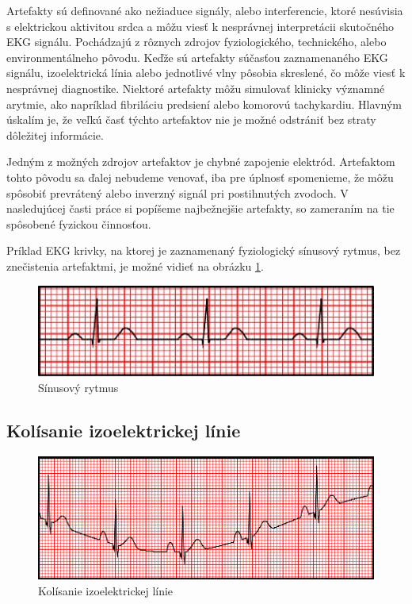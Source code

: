 Artefakty sú definované ako nežiaduce signály, alebo interferencie, ktoré nesúvisia s elektrickou aktivitou srdca a môžu viesť k nesprávnej interpretácii skutočného EKG signálu. Pochádzajú z rôznych zdrojov fyziologického, technického, alebo environmentálneho pôvodu. Keďže sú artefakty súčasťou zaznamenaného EKG signálu, izoelektrická línia alebo jednotlivé vlny pôsobia skreslené, čo môže viesť k nesprávnej diagnostike. Niektoré artefakty môžu simulovať klinicky významné arytmie, ako napríklad fibriláciu predsiení alebo komorovú tachykardiu. Hlavným úskalím je, že veľkú časť týchto artefaktov nie je možné odstrániť bez straty dôležitej informácie. 

Jedným z možných zdrojov artefaktov je chybné zapojenie elektród. Artefaktom tohto pôvodu sa ďalej nebudeme venovať, iba pre úplnosť spomenieme, že môžu spôsobiť prevrátený alebo inverzný signál pri postihnutých zvodoch.\cite{PrezRiera2017}\cite{Littmann2021} V nasledujúcej časti práce si popíšeme najbežnejšie artefakty, so zameraním na tie spôsobené fyzickou činnosťou. 

Príklad EKG krivky, na ktorej je zaznamenaný fyziologický sínusový rytmus, bez znečistenia artefaktmi, je možné vidieť na obrázku \ref{fig:sinus}.

\begin{figure}[H]
    \centering
    \includegraphics[scale=0.75]{img/sinus.jpg}
    \caption{Sínusový rytmus\cite{Mauvila_2018}}
    \label{fig:sinus}
\end{figure}

\subsection{Kolísanie izoelektrickej línie}

\begin{figure}[H]
    \centering
    \includegraphics[scale=0.7]{img/baseline.jpg}
    \caption{Kolísanie izoelektrickej línie\cite{Mauvila_2018}}
\end{figure}

